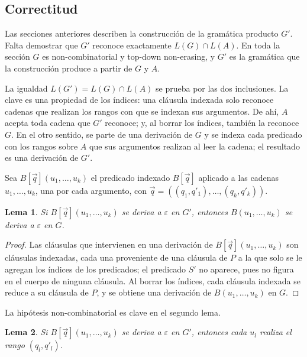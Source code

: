 \documentclass{report}
\theoremstyle{definition}
\theoremstyle{plain}
\newtheorem{lema}{Lema}[chapter]
\theoremstyle{remark}
\begin{document}
\subsection{Correctitud}

Las secciones anteriores describen la construcción de la gramática
producto $G'$. Falta demostrar que $G'$ reconoce exactamente
$L(G) \cap L(A)$. En toda la sección $G$ es non-combinatorial y top-down
non-erasing, y $G'$ es la gramática que la construcción produce a partir
de $G$ y $A$.

La igualdad $L(G') = L(G) \cap L(A)$ se prueba por las dos inclusiones.
La clave es una propiedad de los índices: una cláusula indexada solo
reconoce cadenas que realizan los rangos con que se indexan sus
argumentos. De ahí, $A$ acepta toda cadena que $G'$ reconoce; y, al
borrar los índices, también la reconoce $G$. En el otro sentido, se
parte de una derivación de $G$ y se indexa cada predicado con los rangos
sobre $A$ que sus argumentos realizan al leer la cadena; el resultado es
una derivación de $G'$.

Sea $B[\vec q](u_1, \ldots, u_k)$ el predicado indexado $B[\vec q]$
aplicado a las cadenas $u_1, \ldots, u_k$, una por cada argumento, con
$\vec q = ((q_1, q'_1), \ldots, (q_k, q'_k))$.

\begin{lema}\label{lema:proyeccion}
Si $B[\vec q](u_1, \ldots, u_k)$ se deriva a $\varepsilon$ en $G'$,
entonces $B(u_1, \ldots, u_k)$ se deriva a $\varepsilon$ en $G$.
\end{lema}

\begin{proof}
Las cláusulas que intervienen en una derivación de
$B[\vec q](u_1, \ldots, u_k)$ son cláusulas indexadas, cada una
proveniente de una cláusula de $P$ a la que solo se le agregan los
índices de los predicados; el predicado $S'$ no aparece, pues no figura
en el cuerpo de ninguna cláusula. Al borrar los índices, cada cláusula
indexada se reduce a su cláusula de $P$, y se obtiene una derivación de
$B(u_1, \ldots, u_k)$ en $G$.
\end{proof}

La hipótesis non-combinatorial es clave en el segundo lema.

\begin{lema}\label{lema:realizacion}
Si $B[\vec q](u_1, \ldots, u_k)$ se deriva a $\varepsilon$ en $G'$,
entonces cada $u_l$ realiza el rango $(q_l, q'_l)$.
\end{lema}
\end{document}
